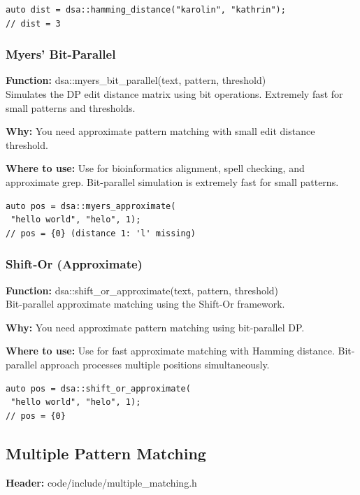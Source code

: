 \documentclass[11pt]{article}
\begin{document}
\begin{lstlisting}
auto dist = dsa::hamming_distance("karolin", "kathrin");
// dist = 3
\end{lstlisting}

\subsubsection{Myers' Bit-Parallel}
\textbf{Function:} dsa::myers\_bit\_parallel(text, pattern, threshold)\\

Simulates the DP edit distance matrix using bit operations. Extremely fast for small patterns and thresholds.

\textbf{Why:} You need approximate pattern matching with small edit distance threshold. \par \textbf{Where to use:} Use for bioinformatics alignment, spell checking, and approximate grep. Bit-parallel simulation is extremely fast for small patterns.

\begin{lstlisting}
auto pos = dsa::myers_approximate(
 "hello world", "helo", 1);
// pos = {0} (distance 1: 'l' missing)
\end{lstlisting}

\subsubsection{Shift-Or (Approximate)}
\textbf{Function:} dsa::shift\_or\_approximate(text, pattern, threshold)\\

Bit-parallel approximate matching using the Shift-Or framework.

\textbf{Why:} You need approximate pattern matching using bit-parallel DP. \par \textbf{Where to use:} Use for fast approximate matching with Hamming distance. Bit-parallel approach processes multiple positions simultaneously.

\begin{lstlisting}
auto pos = dsa::shift_or_approximate(
 "hello world", "helo", 1);
// pos = {0}
\end{lstlisting}

\subsection{Multiple Pattern Matching}
\textbf{Header:} code/include/multiple\_matching.h
\end{document}
